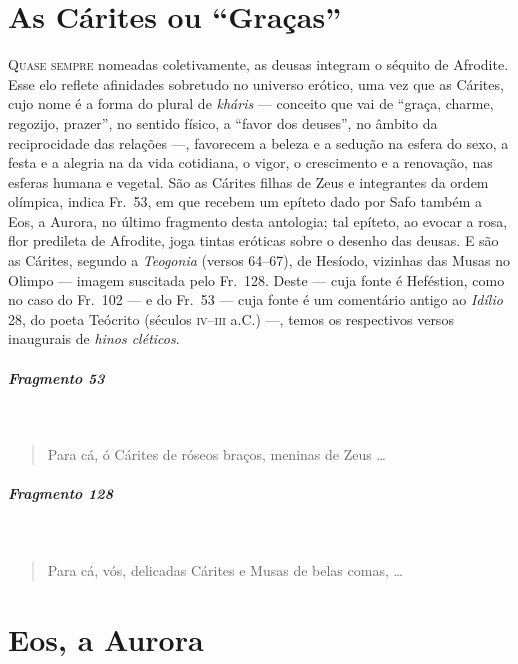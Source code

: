 \chapter{As Cárites ou “Graças”}

\textsc{Quase sempre} nomeadas coletivamente, as deusas integram o séquito de Afrodite.
Esse elo reflete afinidades sobretudo no universo erótico, uma vez que as
Cárites, cujo nome é a forma do plural de \textit{kháris }--- conceito que vai de
“graça, charme, regozijo, prazer”, no sentido físico, a “favor dos deuses”, no
âmbito da reciprocidade das relações ---, favorecem a beleza e a sedução na
esfera do sexo, a festa e a alegria na da vida cotidiana, o vigor, o
crescimento e a renovação, nas esferas humana e vegetal. São as Cárites
filhas de Zeus e integrantes da ordem olímpica, indica Fr.~53, em que
recebem um epíteto dado por Safo também a Eos, a Aurora, no último fragmento desta antologia;
tal epíteto, ao evocar a rosa, flor predileta de Afrodite, joga tintas eróticas
sobre o desenho das deusas. E são as Cárites, segundo a \textit{Teogonia}
(versos 64--67), de Hesíodo, vizinhas das Musas no Olimpo --- imagem suscitada
pelo Fr.~128. Deste --- cuja fonte é Heféstion, como no caso do Fr.~102 --- e do		\EP[]
Fr.~53 --- cuja fonte é um comentário antigo ao \textit{Idílio }28, do poeta
Teócrito (séculos \textsc{iv}--\textsc{iii} a.C.) ---, temos os respectivos versos inaugurais de
\textit{hinos cléticos}.
\pagebreak

\paragraph{Fragmento 53} \

\begin{verse}
Para cá, ó Cárites de róseos braços, meninas de Zeus \ldots{}
\end{verse}

\paragraph{Fragmento 128} \ 

\begin{verse}
Para cá, vós, delicadas Cárites e Musas de belas comas, \ldots{}
\end{verse}


\chapter{Eos, a Aurora}

